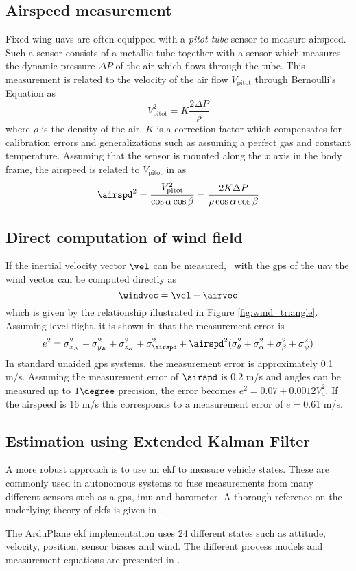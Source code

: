 \subsection{Airspeed measurement}
Fixed-wing \acp{uav} are often equipped with a \textit{pitot-tube} sensor to measure airspeed.
Such a sensor consists of a metallic tube together with a sensor which measures the dynamic pressure $\Delta P$ of 
the air which flows through the tube. This measurement is related to the velocity of the air flow $V_{\text{pitot}}$ through 
Bernoulli's Equation as 
\begin{equation}
    V^2_{\text{pitot}} = K\frac{2\Delta P}{\rho}
\end{equation}
where $\rho$ is the density of the air. $K$ is a correction factor which compensates for calibration errors and 
generalizations such as assuming a perfect gas and constant temperature. Assuming that the sensor is mounted 
along the $x$ axis in the body frame, the airspeed is related to $V_{\text{pitot}}$ in \cite{pitot} as
\begin{equation}
    \airspd^2=\frac{V^2_{\text{pitot}}}{\cos\alpha\cos\beta}=\frac{2K\Delta P}{\rho\cos\alpha\cos\beta}
\end{equation}  

\subsection{Direct computation of wind field}
If the inertial velocity vector $\vel$ can be measured, \eg\ with the \ac{gps} of the \ac{uav} the wind vector can be 
computed directly as 
\begin{equation}
    \windvec = \vel - \airvec
\end{equation}
which is given by the relationship illustrated in Figure \ref{fig:wind_triangle}. Assuming level flight, it is shown in \cite{wind_direct_computation} that 
the measurement error is
\begin{equation}
    e^2=\sigma_{\dot{x}_N}^2+\sigma_{\dot{y}_E}^2+\sigma_{\dot{z}_H}^2+\sigma_{\airspd}^2 + \airspd^2(\sigma_{\theta}^2+\sigma_{\alpha}^2+\sigma_{\beta}^2+\sigma_{\psi}^2)
\end{equation}
In standard unaided \ac{gps} systems, the measurement error is approximately 0.1 m/s. Assuming the measurement error of $\airspd$ is 0.2 m/s and angles 
can be measured up to $1\degree$ precision, the error becomes $e^2=0.07+0.0012V_a^2$. If the airspeed is 16 m/s this corresponds to a measurement error of 
$e=0.61$ m/s.
\subsection{Estimation using Extended Kalman Filter}\label{sec:wind_ekf}
A more robust approach is to use an \ac{ekf} to measure vehicle states. These are 
commonly used in autonomous systems to fuse measurements from many different sensors such as a \ac{gps}, \ac{imu} and barometer. 
A thorough reference on the underlying theory of \acp{ekf} is given in \cite{sensor_fusion}.

The ArduPlane \ac{ekf} implementation uses 24 different states such as attitude, velocity, position, sensor biases and wind. The different process models and 
measurement equations are presented in \cite{px4_ecl_ekf}.